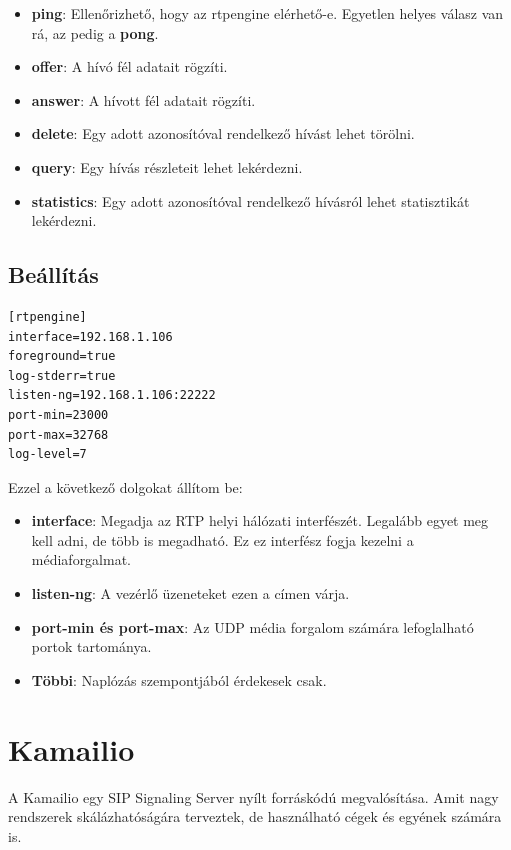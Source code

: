 \begin{itemize}
	\item \textbf{ping}: Ellenőrizhető, hogy az rtpengine elérhető-e. Egyetlen helyes 
	válasz van rá, az pedig a \textbf{pong}.
	\item \textbf{offer}: A hívó fél adatait rögzíti.
	\item \textbf{answer}: A hívott fél adatait rögzíti. 
	\item \textbf{delete}: Egy adott azonosítóval rendelkező hívást lehet törölni.
	\item \textbf{query}: Egy hívás részleteit lehet lekérdezni. 
	\item \textbf{statistics}: Egy adott azonosítóval rendelkező hívásról lehet statisztikát
	lekérdezni. 
\end{itemize} 

\subsection{Beállítás}

\begin{lstlisting}[caption=rtpengine konfigurációja, label=lst:confRtpe]
[rtpengine]
interface=192.168.1.106
foreground=true
log-stderr=true
listen-ng=192.168.1.106:22222
port-min=23000
port-max=32768
log-level=7
\end{lstlisting}

Ezzel a következő dolgokat állítom be: 

\begin{itemize}
	\item \textbf{interface}: Megadja az RTP helyi hálózati interfészét. Legalább
	egyet meg kell adni, de több is megadható. Ez ez interfész fogja kezelni a 
	médiaforgalmat. 
	\item \textbf{listen-ng}: A vezérlő üzeneteket ezen a címen várja. 
	\item \textbf{port-min és port-max}: Az UDP média forgalom számára lefoglalható
	portok tartománya. 
	\item \textbf{Többi}: Naplózás szempontjából érdekesek csak. 
\end{itemize}

\section{Kamailio}

A Kamailio egy SIP Signaling Server nyílt forráskódú megvalósítása. Amit nagy rendszerek
skálázhatóságára terveztek, de használható cégek és egyének számára is.

